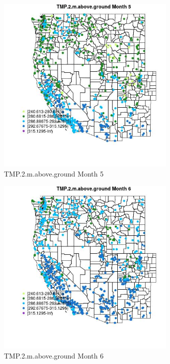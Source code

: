 \begin{figure} 
\centering  
\includegraphics[width=0.77\textwidth]{Code_Outputs/Report_ML_input_PM25_Step4_part_f_de_duplicated_aveswNAs_MapObsMo5TMP2maboveground.jpg} 
\caption{\label{fig:Report_ML_input_PM25_Step4_part_f_de_duplicated_aveswNAsMapObsMo5TMP2maboveground}TMP.2.m.above.ground Month 5} 
\end{figure} 
 

\begin{figure} 
\centering  
\includegraphics[width=0.77\textwidth]{Code_Outputs/Report_ML_input_PM25_Step4_part_f_de_duplicated_aveswNAs_MapObsMo6TMP2maboveground.jpg} 
\caption{\label{fig:Report_ML_input_PM25_Step4_part_f_de_duplicated_aveswNAsMapObsMo6TMP2maboveground}TMP.2.m.above.ground Month 6} 
\end{figure} 
 

